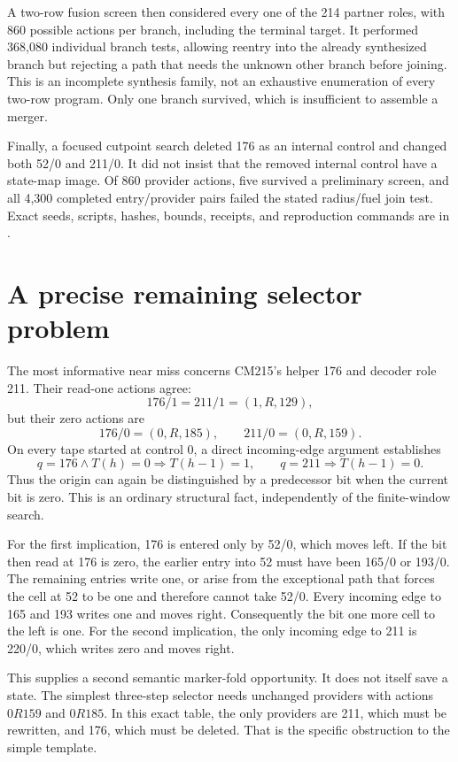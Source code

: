\documentclass[11pt]{article}
\newcommand{\code}[1]{\texttt{\detokenize{#1}}}
\begin{document}
A two-row fusion screen then considered every one of the 214 partner roles, with 860 possible actions per branch, including the terminal target. It performed 368,080 individual branch tests, allowing reentry into the already synthesized branch but rejecting a path that needs the unknown other branch before joining. This is an incomplete synthesis family, not an exhaustive enumeration of every two-row program. Only one branch survived, which is insufficient to assemble a merger.

Finally, a focused cutpoint search deleted 176 as an internal control and changed both 52/0 and 211/0. It did not insist that the removed internal control have a state-map image. Of 860 provider actions, five survived a preliminary screen, and all 4,300 completed entry/provider pairs failed the stated radius/fuel join test. Exact seeds, scripts, hashes, bounds, receipts, and reproduction commands are in \code{reduction_search/}.

\section{A precise remaining selector problem}

The most informative near miss concerns CM215's helper 176 and decoder role 211. Their read-one actions agree:
\[
 176/1=211/1=(1,R,129),
\]
but their zero actions are
\[
 176/0=(0,R,185),\qquad 211/0=(0,R,159).
\]
On every tape started at control 0, a direct incoming-edge argument establishes
\[
 q=176\land T(h)=0\Rightarrow T(h-1)=1,
 \qquad q=211\Rightarrow T(h-1)=0.
\]
Thus the origin can again be distinguished by a predecessor bit when the current bit is zero. This is an ordinary structural fact, independently of the finite-window search.

For the first implication, 176 is entered only by 52/0, which moves left. If the bit then read at 176 is zero, the earlier entry into 52 must have been 165/0 or 193/0. The remaining entries write one, or arise from the exceptional path that forces the cell at 52 to be one and therefore cannot take 52/0. Every incoming edge to 165 and 193 writes one and moves right. Consequently the bit one more cell to the left is one. For the second implication, the only incoming edge to 211 is 220/0, which writes zero and moves right.

This supplies a second semantic marker-fold opportunity. It does not itself save a state. The simplest three-step selector needs unchanged providers with actions $0R159$ and $0R185$. In this exact table, the only providers are 211, which must be rewritten, and 176, which must be deleted. That is the specific obstruction to the simple template.
\end{document}
